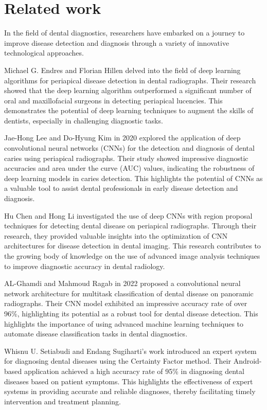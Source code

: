 \section{Related work}

In the field of dental diagnostics, researchers have embarked on a journey to improve disease detection and diagnosis through a variety of innovative technological approaches.

Michael G. Endres and Florian Hillen delved into the field of deep learning algorithms for periapical disease detection in dental radiographs\cite{endres2020development}. Their research showed that the deep learning algorithm outperformed a significant number of oral and maxillofacial surgeons in detecting periapical lucencies. This demonstrates the potential of deep learning techniques to augment the skills of dentists, especially in challenging diagnostic tasks.

Jae-Hong Lee and Do-Hyung Kim in 2020 explored the application of deep convolutional neural networks (CNNs) for the detection and diagnosis of dental caries using periapical radiographs\cite{lee2018detection}. Their study showed impressive diagnostic accuracies and area under the curve (AUC) values, indicating the robustness of deep learning models in caries detection. This highlights the potential of CNNs as a valuable tool to assist dental professionals in early disease detection and diagnosis.

Hu Chen and Hong Li investigated the use of deep CNNs with region proposal techniques for detecting dental disease on periapical radiographs\cite{chen2021dental}. Through their research, they provided valuable insights into the optimization of CNN architectures for disease detection in dental imaging. This research contributes to the growing body of knowledge on the use of advanced image analysis techniques to improve diagnostic accuracy in dental radiology.

AL-Ghamdi and Mahmoud Ragab in 2022 proposed a convolutional neural network architecture for multitask classification of dental disease on panoramic radiographs\cite{al2022detection}. Their CNN model exhibited an impressive accuracy rate of over 96\%, highlighting its potential as a robust tool for dental disease detection. This highlights the importance of using advanced machine learning techniques to automate disease classification tasks in dental diagnostics.

Whisnu U. Setiabudi and Endang Sugiharti's work introduced an expert system for diagnosing dental diseases using the Certainty Factor method\cite{setiabudi2017expert}. Their Android-based application achieved a high accuracy rate of 95\% in diagnosing dental diseases based on patient symptoms. This highlights the effectiveness of expert systems in providing accurate and reliable diagnoses, thereby facilitating timely intervention and treatment planning.

